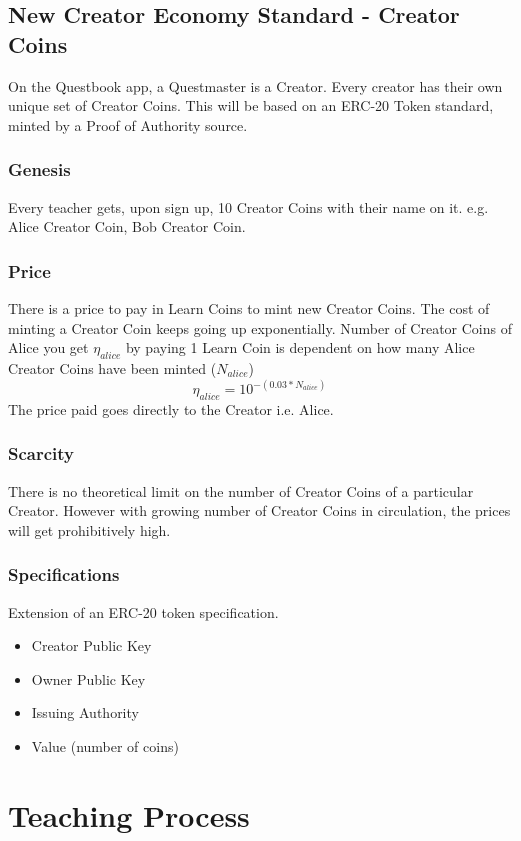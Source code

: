 \documentclass{article}
\begin{document}
    \subsection{New Creator Economy Standard - Creator Coins}
      On the Questbook app, a Questmaster is a Creator. Every creator has their own unique set of Creator Coins. This will be based on an ERC-20 Token standard, minted by a Proof of Authority source.
      \subsubsection{Genesis}
        Every teacher gets, upon sign up, 10 Creator Coins with their name on it. e.g. Alice Creator Coin, Bob Creator Coin.
      \subsubsection{Price}
        There is a price to pay in Learn Coins to mint new Creator Coins. The cost of minting a Creator Coin keeps going up exponentially.
        Number of Creator Coins of Alice you get \(\eta_{alice}\) by paying 1 Learn Coin is dependent on how many Alice Creator Coins have been minted (\(N_{alice}\)) 
        \[
          \eta_{alice} = 10^{-(0.03 * N_{alice})}
        \]
        The price paid goes directly to the Creator i.e. Alice.
      \subsubsection{Scarcity}
        There is no theoretical limit on the number of Creator Coins of a particular Creator. However with growing number of Creator Coins in circulation, the prices will get prohibitively high.
      \subsubsection{Specifications}
        Extension of an ERC-20 token specification.
        \begin{itemize}
          \item Creator Public Key
          \item Owner Public Key
          \item Issuing Authority
          \item Value (number of coins)
        \end{itemize}

      
  \section{Teaching Process}
\end{document}
